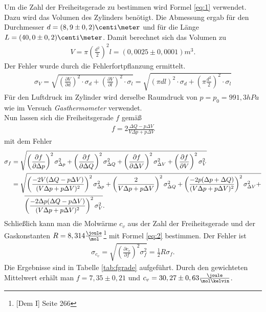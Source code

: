 \documentclass[12pt, a4paper, twoside]{scrartcl}
\begin{document}
Um die Zahl der Freiheitsgerade zu bestimmen wird Formel \ref{eq:1} verwendet. Dazu wird das Volumen des Zylinders benötigt. Die Abmessung ergab für den Durchmesser $d=(8,9\pm0,2)\centi\meter$ und für die Länge $L=(40,0\pm0,2)\centi\meter$. Damit berechnet sich das Volumen zu \begin{align*}V=\pi \left(\frac{d^2}{2}\right)^2l=(0,0025\pm0,0001)m^3.\end{align*} Der Fehler wurde durch die Fehlerfortpflanzung ermittelt.
\begin{align*}
\sigma_V=\sqrt{\left(\frac{\partial V}{\partial d}\right)^2\cdot\sigma_d+\left(\frac{\partial V}{\partial l}\right)^2\cdot\sigma_l}=\sqrt{\left(\pi dl\right)^2\cdot\sigma_d+\left(\pi \frac{d^2}{2}\right)^2\cdot\sigma_l}
\end{align*}
Für den Luftdruck im Zylinder wird derselbe Raumdruck von $p=p_0=991,3hPa$ wie im Versuch \textit{Gasthermometer} verwendet.\\
Nun lassen sich die Freiheitsgerade $f$ gemäß
\begin{align*}
f=2\frac{\Delta Q-p\Delta V}{V\Delta p+p\Delta V}
\end{align*}
mit dem Fehler
\begin{align*}
\sigma_f&=\sqrt{\left(\frac{\partial f}{\partial \Delta p}\right)^2\sigma_{\Delta p}^2+\left(\frac{\partial f}{\partial \Delta Q}\right)^2\sigma_{\Delta Q}^2+\left(\frac{\partial f}{\partial \Delta V}\right)^2\sigma_{\Delta V}^2+\left(\frac{\partial f}{\partial V}\right)^2\sigma_{V}^2}\\
 &=\sqrt{\left(\frac{-2V(\Delta Q-p\Delta V)}{(V\Delta p+p\Delta V)^2}\right)^2\sigma_{\Delta p}^2+\left(\frac{2}{V\Delta p+p\Delta V}\right)^2\sigma_{\Delta Q}^2+\left(\frac{-2p(\Delta p+\Delta Q)}{(V\Delta p+p\Delta V)^2}\right)^2\sigma_{\Delta V}^2+}\\
 &\hspace{0.7cm}\overline{\left(\frac{-2\Delta p(\Delta Q-p\Delta V)}{(V\Delta p+p\Delta V)^2}\right)^2\sigma_V^2}.
\end{align*}
Schließlich kann man die Molwärme $c_v$ aus der Zahl der Freiheitsgerade und der Gaskonstanten $R=8,314\frac{\joule}{\mol}$\footnote{[Dem I] Seite 266} mit Formel \ref{eq:2} bestimmen. Der Fehler ist
\begin{align*}
\sigma_{c_v}=\sqrt{\left(\frac{\partial c_v}{\partial f}\right)^2\sigma_f^2}=\frac{1}{2}R\sigma_f.
\end{align*}
Die Ergebnisse sind in Tabelle \ref{tab:fgrade} aufgeführt. Durch den gewichteten Mittelwert erhält man $f=7,35\pm0,21$ und $c_v=30,27\pm0,63\frac{\joule}{\mol\kelvin}$.
\end{document}
